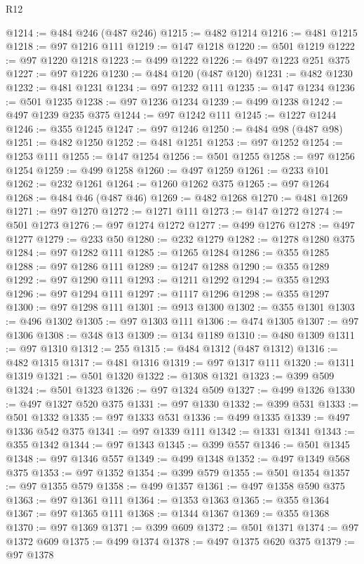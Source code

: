\begin{lexlean}{R12}
\begin{coremodule}
@1214 := @484 @246 (@487 @246)
@1215 := @482 @1214
@1216 := @481 @1215
@1218 := @97 @1216 @111
@1219 := @147 @1218
@1220 := @501 @1219
@1222 := @97 @1220 @1218
@1223 := @499 @1222
@1226 := @497 @1223 @251 @375
@1227 := @97 @1226
@1230 := @484 @120 (@487 @120)
@1231 := @482 @1230
@1232 := @481 @1231
@1234 := @97 @1232 @111
@1235 := @147 @1234
@1236 := @501 @1235
@1238 := @97 @1236 @1234
@1239 := @499 @1238
@1242 := @497 @1239 @235 @375
@1244 := @97 @1242 @111
@1245 := @1227 @1244
@1246 := @355 @1245
@1247 := @97 @1246
@1250 := @484 @98 (@487 @98)
@1251 := @482 @1250
@1252 := @481 @1251
@1253 := @97 @1252
@1254 := @1253 @111
@1255 := @147 @1254
@1256 := @501 @1255
@1258 := @97 @1256 @1254
@1259 := @499 @1258
@1260 := @497 @1259
@1261 := @233 @101
@1262 := @232 @1261
@1264 := @1260 @1262 @375
@1265 := @97 @1264
@1268 := @484 @46 (@487 @46)
@1269 := @482 @1268
@1270 := @481 @1269
@1271 := @97 @1270
@1272 := @1271 @111
@1273 := @147 @1272
@1274 := @501 @1273
@1276 := @97 @1274 @1272
@1277 := @499 @1276
@1278 := @497 @1277
@1279 := @233 @50
@1280 := @232 @1279
@1282 := @1278 @1280 @375
@1284 := @97 @1282 @111
@1285 := @1265 @1284
@1286 := @355 @1285
@1288 := @97 @1286 @111
@1289 := @1247 @1288
@1290 := @355 @1289
@1292 := @97 @1290 @111
@1293 := @1211 @1292
@1294 := @355 @1293
@1296 := @97 @1294 @111
@1297 := @1117 @1296
@1298 := @355 @1297
@1300 := @97 @1298 @111
@1301 := @913 @1300
@1302 := @355 @1301
@1303 := @496 @1302
@1305 := @97 @1303 @111
@1306 := @474 @1305
@1307 := @97 @1306
@1308 := @348 @13
@1309 := @134 @1189
@1310 := @480 @1309
@1311 := @97 @1310
@1312 := 255
@1315 := @484 @1312 (@487 @1312)
@1316 := @482 @1315
@1317 := @481 @1316
@1319 := @97 @1317 @111
@1320 := @1311 @1319
@1321 := @501 @1320
@1322 := @1308 @1321
@1323 := @399 @509
@1324 := @501 @1323
@1326 := @97 @1324 @509
@1327 := @499 @1326
@1330 := @497 @1327 @520 @375
@1331 := @97 @1330
@1332 := @399 @531
@1333 := @501 @1332
@1335 := @97 @1333 @531
@1336 := @499 @1335
@1339 := @497 @1336 @542 @375
@1341 := @97 @1339 @111
@1342 := @1331 @1341
@1343 := @355 @1342
@1344 := @97 @1343
@1345 := @399 @557
@1346 := @501 @1345
@1348 := @97 @1346 @557
@1349 := @499 @1348
@1352 := @497 @1349 @568 @375
@1353 := @97 @1352
@1354 := @399 @579
@1355 := @501 @1354
@1357 := @97 @1355 @579
@1358 := @499 @1357
@1361 := @497 @1358 @590 @375
@1363 := @97 @1361 @111
@1364 := @1353 @1363
@1365 := @355 @1364
@1367 := @97 @1365 @111
@1368 := @1344 @1367
@1369 := @355 @1368
@1370 := @97 @1369
@1371 := @399 @609
@1372 := @501 @1371
@1374 := @97 @1372 @609
@1375 := @499 @1374
@1378 := @497 @1375 @620 @375
@1379 := @97 @1378

\end{coremodule}
\end{lexlean}

